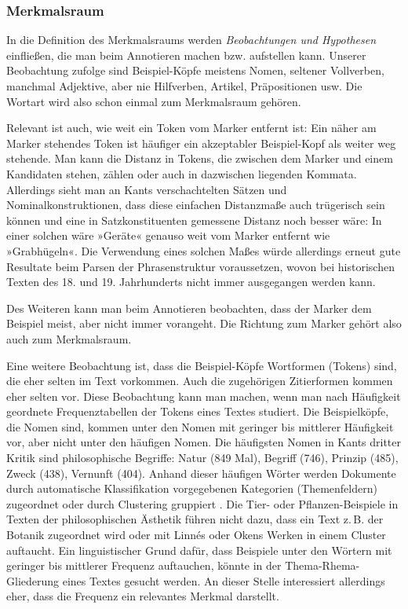 \documentclass{article}
\begin{document}
\subsubsection{Merkmalsraum}

In die Definition des Merkmalsraums werden \emph{Beobachtungen und
  Hypothesen} einfließen, die man beim Annotieren machen
bzw. aufstellen kann. Unserer Beobachtung zufolge sind Beispiel-Köpfe
meistens Nomen, seltener Vollverben, manchmal Adjektive, aber nie
Hilfverben, Artikel, Präpositionen usw. Die Wortart wird also schon
einmal zum Merkmalsraum gehören.

Relevant ist auch, wie weit ein Token vom Marker entfernt ist: Ein
näher am Marker stehendes Token ist häufiger ein akzeptabler
Beispiel-Kopf als weiter weg stehende. Man kann die Distanz in Tokens,
die zwischen dem Marker und einem Kandidaten stehen, zählen oder auch
in dazwischen liegenden Kommata. Allerdings sieht man an Kants
verschachtelten Sätzen und Nominalkonstruktionen, dass diese einfachen
Distanzmaße auch trügerisch sein können und eine in Satzkonstituenten
gemessene Distanz noch besser wäre: In einer solchen wäre »Geräte«
genauso weit vom Marker entfernt wie »Grabhügeln«. Die Verwendung
eines solchen Maßes würde allerdings erneut gute Resultate beim Parsen
der Phrasenstruktur voraussetzen, wovon bei historischen Texten des
18. und 19. Jahrhunderts nicht immer ausgegangen werden kann.  

Des Weiteren kann man beim Annotieren beobachten, dass der Marker dem
Beispiel meist, aber nicht immer vorangeht. Die Richtung zum Marker
gehört also auch zum Merkmalsraum.

Eine weitere Beobachtung ist, dass die Beispiel-Köpfe Wortformen
(Tokens) sind, die eher selten im Text vorkommen. Auch die zugehörigen
Zitierformen kommen eher selten vor. Diese Beobachtung kann man
machen, wenn man nach Häufigkeit geordnete Frequenztabellen der Tokens
eines Textes studiert. Die Beispielköpfe, die Nomen sind, kommen unter
den Nomen mit geringer bis mittlerer Häufigkeit vor, aber nicht unter
den häufigen Nomen. Die häufigsten Nomen in Kants dritter Kritik sind
philosophische Begriffe: Natur (849 Mal), Begriff (746), Prinzip
(485), Zweck (438), Vernunft (404). Anhand dieser häufigen Wörter
werden Dokumente durch automatische Klassifikation vorgegebenen
Kategorien (Themenfeldern) zugeordnet \parencite{Sebastiani2002a} oder
durch Clustering gruppiert \parencite[195--209]{Heyer2006a}. Die Tier-
oder Pflanzen-Beispiele in Texten der philosophischen Ästhetik führen
nicht dazu, dass ein Text z.\,B. der Botanik zugeordnet wird oder mit
Linnés oder Okens Werken in einem Cluster auftaucht. Ein
linguistischer Grund dafür, dass Beispiele unter den Wörtern mit
geringer bis mittlerer Frequenz auftauchen, könnte in der
Thema-Rhema-Gliederung eines Textes gesucht
werden. \Parencite[784-786]{Bussm1990} An dieser Stelle interessiert
allerdings eher, dass die Frequenz ein relevantes Merkmal darstellt.
\end{document}
